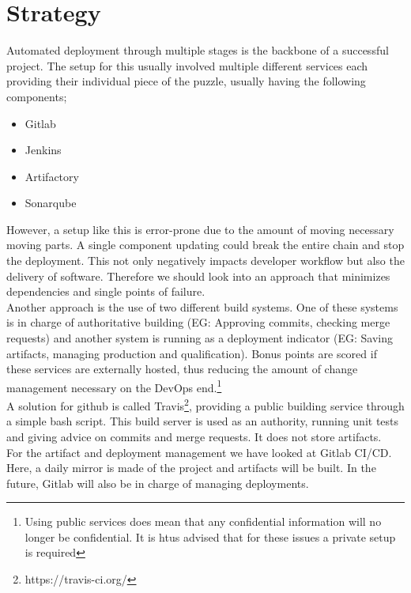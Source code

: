 \chapter{Strategy}

Automated deployment through multiple stages is the backbone of a successful project. The setup for this usually involved multiple different services each providing their individual piece of the puzzle, usually having the following components;

\begin{itemize}
	\item Gitlab
	\item Jenkins
	\item Artifactory
	\item Sonarqube
\end{itemize}

However, a setup like this is error-prone due to the amount of moving necessary moving parts. A single component updating could break the entire chain and stop the deployment. This not only negatively impacts developer workflow but also the delivery of software. Therefore we should look into an approach that minimizes dependencies and single points of failure. \\

Another approach is the use of two different build systems. One of these systems is in charge of authoritative building (EG: Approving commits, checking merge requests) and another system is running as a deployment indicator (EG: Saving artifacts, managing production and qualification). Bonus points are scored if these services are externally hosted, thus reducing the amount of change management necessary on the DevOps end.\footnote{Using public services does mean that any confidential information will no longer be confidential. It is htus advised that for these issues a private setup is required} \\

A solution for github is called Travis\footnote{https://travis-ci.org/}, providing a public building service through a simple bash script. This build server is used as an authority, running unit tests and giving advice on commits and merge requests. It does not store artifacts. \\

For the artifact and deployment management we have looked at Gitlab CI/CD. Here, a daily mirror is  made of the project and artifacts will be built. In the future, Gitlab will also be in charge of managing deployments.